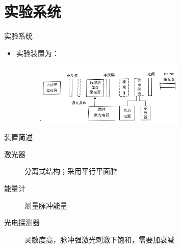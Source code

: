 \documentclass{beamer}
\begin{document}
% 
\section{实验系统}
\begin{frame}{实验系统}
  \begin{itemize}
    \item 实验装置为：
    \begin{figure}
      \includegraphics[height=3cm,width=7.5cm]{images/6.jpg}
      \label{fg2}
    \end{figure}
  \end{itemize}
  

\begin{block}{装置简述}
  \begin{description}
    \item[激光器] 分离式结构；采用平行平面腔  
    \item[能量计] 测量脉冲能量
    \item[光电探测器] 灵敏度高，脉冲强激光刺激下饱和，需要加衰减
  \end{description}
\end{block}
  
\end{frame}
\end{document}
